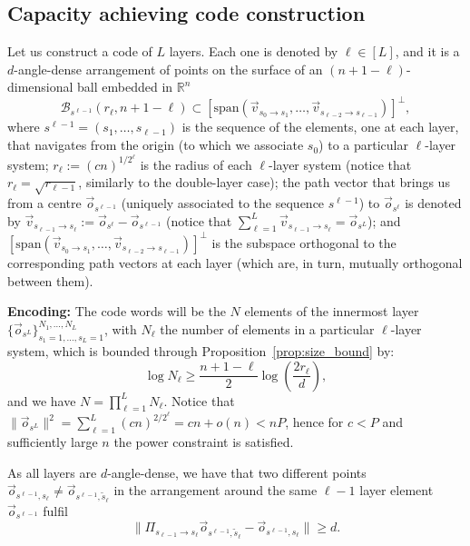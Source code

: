 \documentclass[10pt,conference]{IEEEtran}
\newcommand{\1}{\mathds{1}}
\newcommand{\RR}{\mathbb{R}}
\newcommand{\cB}{\mathcal{B}}
\begin{document}
\subsection{Capacity achieving code construction}
Let us construct a code of $L$ layers. Each one is denoted by $\ell\in[L]$, and it is a $d$-angle-dense arrangement of points on the surface of an $(n\!+\!1\!-\!\ell)$-dimensional ball embedded in $\RR^n$
\begin{equation}
\cB_{s^{\ell-1}}\left(r_\ell,n+1-\ell\right)\subset\left[\text{span}\left(\vec v_{s_0\to s_1},\dots,\vec{v}_{s_{\ell-2}\to s_{\ell-1}}\right)\right]^\perp,
\end{equation}
where $s^{\ell-1}=(s_1,\dots,s_{\ell-1})$ is the sequence of the elements, one at each layer, that navigates from the origin (to which we associate $s_0$) to a particular $\ell$-layer system; $r_\ell:=(cn)^{1/2^\ell}$ is the radius of each $\ell$-layer system (notice that $r_\ell=\sqrt{r_{\ell-1}}$, similarly to the double-layer case); the path vector that brings us from a centre $\vec o_{s^{\ell-1}}$ (uniquely associated to the sequence $s^{\ell-1}$) to $\vec o_{s^{\ell}}$ is denoted by $\vec v_{s_{\ell-1}\to s_\ell}:=\vec o_{s^{\ell}}-\vec o_{s^{\ell-1}}$ (notice that $\sum_{\ell=1}^L\vec v_{s_{\ell-1}\to s_\ell}=\vec{o}_{s^L}$); and $\left[\text{span}\left(\vec v_{s_0\to s_1},\dots,\vec{v}_{s_{\ell-2}\to s_{\ell-1}}\right)\right]^\perp$ is the subspace orthogonal to the corresponding path vectors at each layer (which are, in turn, mutually orthogonal between them).
\medskip

\noindent\textbf{Encoding:} The code words will be the $N$ elements of the innermost layer $\{\vec o_{s^L}\}_{s_1=1,\dots,s_L=1}^{N_1,\dots,N_L}$, with $N_\ell$ the number of elements in a particular $\ell$-layer system, which is bounded through Proposition~\ref{prop:size_bound} by:
\begin{equation}\label{eq:encoding_code_size}
\log N_\ell\geq\frac{n+1-\ell}{2}\log \left(\frac{2r_\ell}{d}\right),
\end{equation}
and we have $N=\prod_{\ell=1}^{L}N_{\ell}$. 
Notice that $\|\vec o_{s^L}\|^2=\sum_{\ell=1}^{L}(cn)^{2/2^\ell}=cn+o(n)<nP$, hence for $c<P$ and sufficiently large $n$ the power constraint is satisfied.

As all layers are $d$-angle-dense, we have that two different points $\vec o_{s^{\ell-1},s_\ell}\neq\vec o_{s^{\ell-1},\tilde s_\ell}$ in the arrangement around the same $\ell-1$ layer element $\vec o_{s^{\ell-1}}$ fulfil
\begin{equation}
\|\Pi_{s_{\ell-1}\to s_\ell}\vec o_{s^{\ell-1},\tilde s_\ell}-\vec o_{s^{\ell-1},s_\ell}\| \geq d.    
\end{equation}
\end{document}
